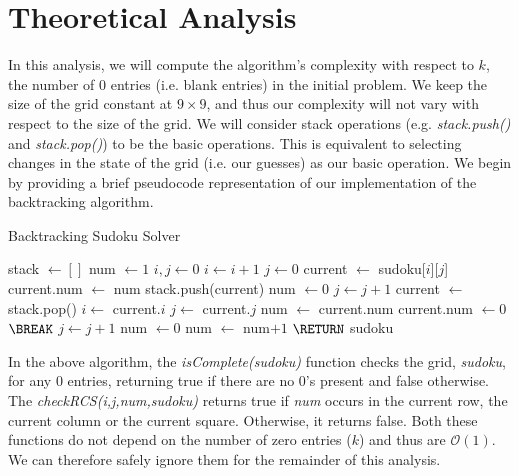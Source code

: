 \documentclass[a4paper]{article}
\begin{document}
\section{Theoretical Analysis}
In this analysis, we will compute the algorithm's complexity with respect to $k$, the number of 0 entries (i.e. blank entries) in the initial problem. We keep the size of the grid constant at $9 \times 9$, and thus our complexity will not vary with respect to the size of the grid.
\newline
We will consider stack operations (e.g. \textit{stack.push()} and \textit{stack.pop()}) to be the basic operations. This is equivalent to selecting changes in the state of the grid (i.e. our guesses) as our basic operation.
\newline
We begin by providing a brief pseudocode representation of our implementation of the backtracking algorithm.
\begin{algorithm}[H]
\caption{Backtracking Sudoku Solver}\label{backtrack}
\begin{algorithmic}[1]
    \State stack $\gets []$
    \State num $\gets 1$
    \State $i,j \gets 0$
            \State $i \gets i+1$
            \State $j \gets 0$
        \EndIf
        \State current $\gets$ sudoku[$i$][$j$]
                \State current.num $\gets$ num
                \State stack.push(current)
                \State num $\gets 0$
                \State $j \gets j+1$
            \Else
                        \State current $\gets$ stack.pop()
                        \State $i \gets $ current.$i$
                        \State $j \gets $ current.$j$
                        \State num $\gets $ current.num
                        \State current.num $\gets 0$
                    \Else
                        \State $\BREAK$
                    \EndIf
                \EndIf
            \EndIf
        \Else
            \State $j \gets j+1$
            \State num $\gets 0$
        \EndIf
        \State num $\gets$ num$+1$
    \EndWhile
    \State $\RETURN$ sudoku
\EndProcedure
\end{algorithmic}
\end{algorithm}
In the above algorithm, the \textit{isComplete(sudoku)} function checks the grid, \textit{sudoku}, for any 0 entries, returning true if there are no 0's present and false otherwise. The \textit{checkRCS(i,j,num,sudoku)} returns true if \textit{num} occurs in the current row, the current column or the current square. Otherwise, it returns false. Both these functions do not depend on the number of zero entries ($k$) and thus are $\mathcal{O}(1)$. We can therefore safely ignore them for the remainder of this analysis.
\end{document}
